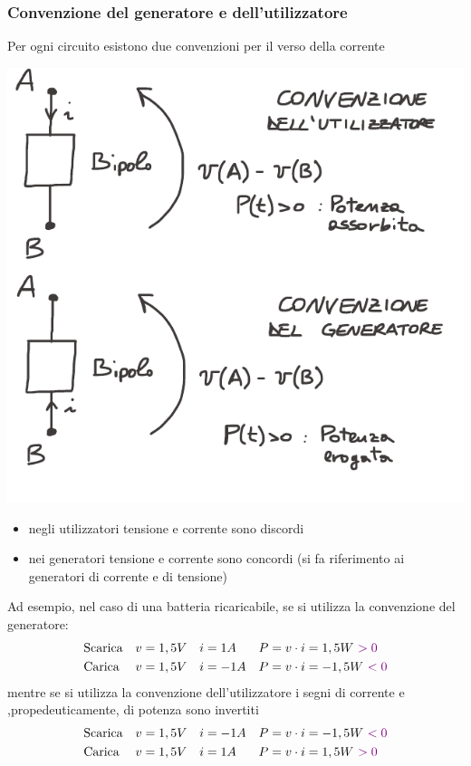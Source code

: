 \documentclass{article}
\begin{document}
\subsubsection{Convenzione del generatore e dell'utilizzatore}
Per ogni circuito esistono due convenzioni per il verso della corrente
\begin{center}
    \includegraphics[scale=0.3]{Image/Convenzione.png}
\end{center}
\begin{itemize}
    \item negli utilizzatori tensione e corrente sono discordi
    \item nei generatori tensione e corrente sono concordi (si fa riferimento ai generatori di corrente e di tensione)
\end{itemize}
Ad esempio, nel caso di una batteria ricaricabile, se si utilizza la convenzione del generatore:
\begin{align*}
    &\text{Scarica} & v&=1,5 V & i&=1A & P&=v\cdot i = 1,5W \ {\color{violet}>0}\\
    &\text{Carica} & v&=1,5 V & i&=-1A & P&=v\cdot i = -1,5W \ {\color{violet}<0}
\end{align*} 
mentre se si utilizza la convenzione dell'utilizzatore i segni di corrente e ,propedeuticamente, di potenza sono invertiti 
\begin{align*}
    &\text{Scarica} & v&=1,5 V & i&=-1A & P&=v\cdot i = -1,5W \ {\color{violet}<0}\\
    &\text{Carica} & v&=1,5 V & i&=1A & P&=v\cdot i = 1,5W \ {\color{violet}>0}
\end{align*} 
\end{document}
